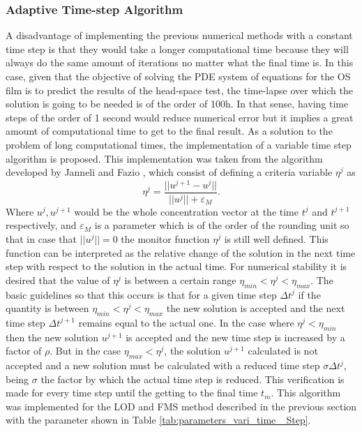 \documentclass[twoside,11pt]{report}
\begin{document}
\subsubsection{Adaptive Time-step Algorithm}
A disadvantage of implementing the previous numerical methods with a constant time step is that they would take a longer computational time because they will always do the same amount of iterations no matter what the final time is. In this case, given that the objective of solving the PDE system of equations for the OS film is to predict the results of the head-space test, the time-lapse over which the solution is going to be needed is of the order of 100h. In that sense, having time steps of the order of 1 second would reduce numerical error but it implies a great amount of computational time to get to the final result. As a solution to the problem of long computational times, the implementation of a variable time step algorithm is proposed. This implementation was taken from the algorithm developed by Janneli and Fazio \cite{Jannelli2006AdaptiveComplexity}, which consist of defining a criteria variable $\eta^j$ as
\begin{equation}
    \eta^j= \frac{||u^{j+1}-u^{j}||}{||u^{j}||+\varepsilon_M}.
\end{equation}
Where $u^j,u^{j+1} $ would be the whole concentration vector at the time $t^j$ and $t^{j+1}$ respectively, and $\varepsilon_M$ is a parameter which is of the order of the rounding unit so that in case that $||u^{j}||=0$ the monitor function $\eta^j$ is still well defined. This function can be interpreted as the relative change of the solution in the next time step with respect to the solution in the actual time. For numerical stability  it is desired that the value of $\eta^j$ is between a certain range $ \eta_{min}<\eta^j <\eta_{max}$. The basic guidelines so that this occurs is that for a given time step $\Delta t^j$ if the quantity is between $ \eta_{min}<\eta^j <\eta_{max}$ the new solution is accepted and the next time step $\Delta t^{j+1}$ remains equal to the actual one. In the case where $\eta^j<\eta_{min}$ then the new solution $u^{j+1}$ is accepted and the new time step is increased by a factor of $\rho$. But in the case $ \eta_{max}<\eta^j$, the solution $u^{j+1}$ calculated is not accepted and a new solution must be calculated with a reduced time step $\sigma \Delta t^j$, being $\sigma$ the factor by which the actual time step is reduced. This verification is made for every time step until the getting to the final time $t_m$. This algorithm was implemented for the LOD and FMS method described in the previous section with the parameter shown in Table \ref{tab:parameters_vari_time _Step}.
\end{document}
